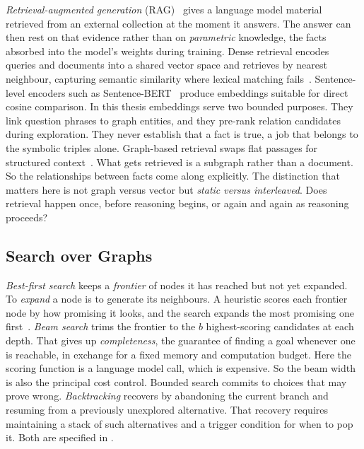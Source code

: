 \emph{Retrieval-augmented generation}
(RAG)~\cite{lewis2020retrieval} gives a language model material retrieved from
an external collection at the moment it answers. The answer can then rest on
that evidence rather than on \emph{parametric} knowledge, the facts absorbed
into the model's weights during training. Dense retrieval encodes queries and
documents into a shared vector space and retrieves by nearest neighbour,
capturing semantic similarity where lexical matching
fails~\cite{karpukhin2020dense}. Sentence-level encoders such as
Sentence-BERT~\cite{reimers2019sentence} produce embeddings suitable for direct
cosine comparison. In this thesis embeddings serve two bounded purposes. They
link question phrases to graph entities, and they pre-rank relation candidates
during exploration. They never establish that a fact is true, a job that belongs
to the symbolic triples alone. Graph-based retrieval swaps flat passages for
structured context~\cite{edge2024local,gutierrez2024hipporag}. What gets
retrieved is a subgraph rather than a document. So the relationships between
facts come along explicitly. The distinction that matters here is not graph
versus vector but \emph{static versus interleaved}. Does retrieval happen once,
before reasoning begins, or again and again as reasoning proceeds?

\subsection{Search over Graphs}\label{sec:search}

\emph{Best-first search} keeps a \emph{frontier} of
nodes it has reached but not yet expanded. To \emph{expand} a node is to
generate its neighbours. A heuristic scores each frontier node by how promising
it looks, and the search expands the most promising one
first~\cite{hart1968formal,pearl1984heuristics}. \emph{Beam search} trims the
frontier to the $b$ highest-scoring candidates at each depth. That gives up
\emph{completeness}, the guarantee of finding a goal whenever one is reachable,
in exchange for a fixed memory and computation budget. Here the scoring function
is a language model call, which is expensive. So the beam width is also the
principal cost control. Bounded search commits to choices that may prove wrong.
\emph{Backtracking} recovers by abandoning the current
branch and resuming from a previously unexplored alternative. That recovery
requires maintaining a stack of such alternatives and a trigger condition for
when to pop it. Both are specified in .

